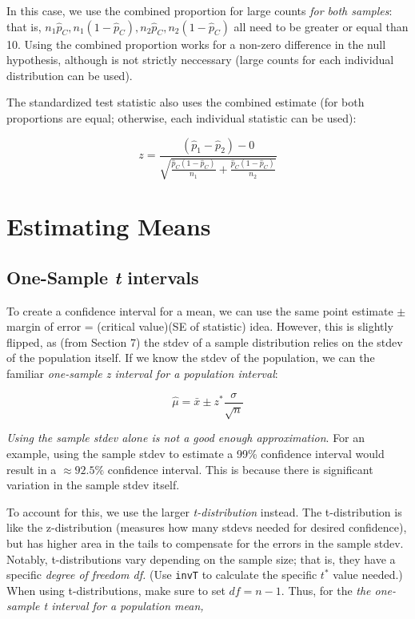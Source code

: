 \documentclass[12pt, a4paper]{article}
\theoremstyle{definition}
\begin{document}
In this case, we use the combined proportion for large counts \textit{for both samples}: that is, $n_1 \hat{p}_C, n_1 (1 - \hat{p}_C), n_2 \hat{p}_C, n_2 (1 - \hat{p}_C)$ all need to be greater or equal than 10.
Using the combined proportion works for a non-zero difference in the null hypothesis, although is not strictly neccessary (large counts for each individual distribution can be used).

The standardized test statistic also uses the combined estimate (for both proportions are equal; otherwise, each individual statistic can be used):

\[z = \frac{(\hat{p}_1 - \hat{p}_2) - 0}{\sqrt{\frac{\hat{p}_C (1 - \hat{p}_C)}{n_1} + \frac{\hat{p}_C (1 - \hat{p}_C)}{n_2}}}\]

\newpage

\section{Estimating Means}

\subsection{One-Sample \textit{t} intervals}

To create a confidence interval for a mean, we can use the same point estimate $\pm$ margin of error = (critical value)(SE of statistic) idea.
However, this is slightly flipped, as (from Section 7) the stdev of a sample distribution relies on the stdev of the population itself.
If we know the stdev of the population, we can the familiar \textit{one-sample z interval for a population interval}:

\[\hat{\mu} = \bar{x} \pm z^{*}\frac{\sigma}{\sqrt{n}}\]

\textit{Using the sample stdev alone is not a good enough approximation}.
For an example, using the sample stdev to estimate a 99\% confidence interval would result in a $\approx 92.5\%$ confidence interval.
This is because there is significant variation in the sample stdev itself.

To account for this, we use the larger \textit{t-distribution} instead.
The t-distribution is like the z-distribution (measures how many stdevs needed for desired confidence), but has higher area in the tails to compensate for the errors in the sample stdev.
Notably, t-distributions vary depending on the sample size; that is, they have a specific \textit{degree of freedom df.}
(Use \verb|invT| to calculate the specific $t^{*}$ value needed.)
When using t-distributions, make sure to set $df = n - 1$. Thus, for the \textit{the one-sample t interval for a population mean,}
\end{document}
